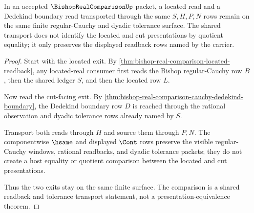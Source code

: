 \begin{theorem}
\label{thm:bishop-real-comparison-located-cut-transport}
In an accepted $\BishopRealComparisonUp$ packet, a located read and a Dedekind boundary read transported through the same $S,H,P,N$ rows remain on the same finite regular-Cauchy and dyadic tolerance surface. The shared transport does not identify the located and cut presentations by quotient equality; it only preserves the displayed readback rows named by the carrier.
\end{theorem}
\begin{proof}
Start with the located exit. By \autoref{thm:bishop-real-comparison-located-readback}, any located-real consumer first reads the Bishop regular-Cauchy row $B$, then the shared ledger $S$, and then the located row $L$.

Now read the cut-facing exit. By \autoref{thm:bishop-real-comparison-cauchy-dedekind-boundary}, the Dedekind boundary row $D$ is reached through the rational observation and dyadic tolerance rows already named by $S$.

Transport both reads through $H$ and source them through $P,N$. The componentwise $\hsame$ and displayed $\Cont$ rows preserve the visible regular-Cauchy windows, rational readbacks, and dyadic tolerance packets; they do not create a host equality or quotient comparison between the located and cut presentations.

Thus the two exits stay on the same finite surface. The comparison is a shared readback and tolerance transport statement, not a presentation-equivalence theorem.
\end{proof}

